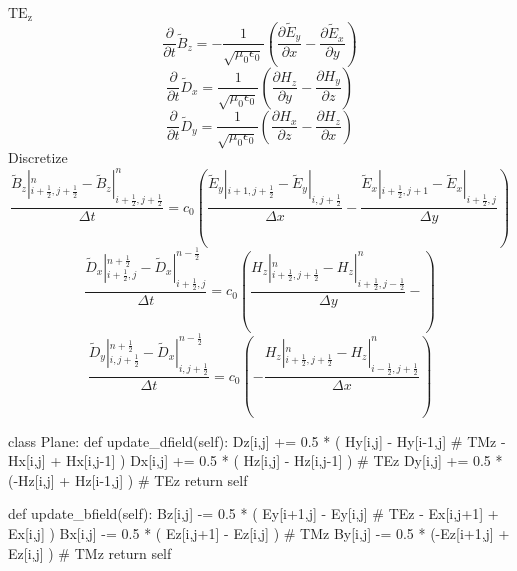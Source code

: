 $\mathrm{TE_z}$
\begin{displaymath}
    \frac{\partial}{\partial t}\widetilde{B}_z =-\frac{1}{\sqrt{\mu_0\epsilon_0}}\left(\frac{\partial \widetilde{E}_y}{\partial x} - \frac{\partial \widetilde{E}_x}{\partial y}\right)\label{eq:up_b_z}
\end{displaymath}
\begin{displaymath}
  \frac{\partial}{\partial t}\widetilde{D}_x = \frac{1}{\sqrt{\mu_0\epsilon_0}}\left(\frac{\partial H_z}{\partial y} - \frac{\partial H_y}{\partial z}\right)
\end{displaymath}
\begin{displaymath}
  \frac{\partial}{\partial t}\widetilde{D}_y = \frac{1}{\sqrt{\mu_0\epsilon_0}}\left(\frac{\partial H_x}{\partial z} - \frac{\partial H_z}{\partial x}\right)
\end{displaymath}
Discretize
\begin{displaymath}
  \frac{\widetilde{B}_z|_{i+\frac{1}{2},j+\frac{1}{2}}^{n} - \widetilde{B}_z|_{i+\frac{1}{2},j+\frac{1}{2}}^{n}}{\Delta t} =
  c_0\left(\frac{\widetilde{E}_y|_{i+1,j+\frac{1}{2}}^{} - \widetilde{E}_y|_{i,j+\frac{1}{2}}^{}}{\Delta x} - \frac{\widetilde{E}_x|_{i+\frac{1}{2},j+1}^{} - \widetilde{E}_x|_{i+\frac{1}{2},j}^{}}{\Delta y}\right)
\end{displaymath}
\begin{displaymath}
  \frac{\widetilde{D}_x|_{i+\frac{1}{2},j}^{n+\frac{1}{2}} - \widetilde{D}_x|_{i+\frac{1}{2},j}^{n-\frac{1}{2}}}{\Delta t} =
  c_0\left(\frac{H_z|_{i+\frac{1}{2},j+\frac{1}{2}}^{n} - H_z|_{i+\frac{1}{2},j-\frac{1}{2}}^{n}}{\Delta y} - \right)
\end{displaymath}
\begin{displaymath}
  \frac{\widetilde{D}_y|_{i,j+\frac{1}{2}}^{n+\frac{1}{2}} - \widetilde{D}_x|_{i,j+\frac{1}{2}}^{n-\frac{1}{2}}}{\Delta t} =
  c_0\left( - \frac{H_z|_{i+\frac{1}{2},j+\frac{1}{2}}^{n} - H_z|_{i-\frac{1}{2},j+\frac{1}{2}}^{n}}{\Delta x}\right)
\end{displaymath}


\begin{code}
class Plane:
    def update\_dfield(self):
        Dz[i,j] += 0.5 * ( Hy[i,j] - Hy[i-1,j]   # TMz
                         - Hx[i,j] + Hx[i,j-1] )
        Dx[i,j] += 0.5 * ( Hz[i,j] - Hz[i,j-1] ) # TEz
        Dy[i,j] += 0.5 * (-Hz[i,j] + Hz[i-1,j] ) # TEz
        return self

    def update\_bfield(self):
        Bz[i,j] -= 0.5 * ( Ey[i+1,j] - Ey[i,j]   # TEz
                         - Ex[i,j+1] + Ex[i,j] ) 
        Bx[i,j] -= 0.5 * ( Ez[i,j+1] - Ez[i,j] ) # TMz
        By[i,j] -= 0.5 * (-Ez[i+1,j] + Ez[i,j] ) # TMz
        return self
\end{code}






